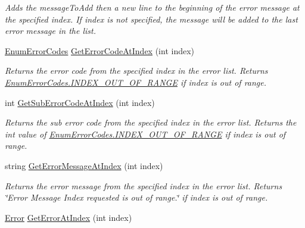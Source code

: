 \begin{DoxyCompactItemize}
\begin{DoxyCompactList}\small\item\em Adds the message\+To\+Add then a new line to the beginning of the error message at the specified index. If index is not specified, the message will be added to the last error message in the list. \end{DoxyCompactList}\item 
\mbox{\hyperlink{namespace_c_s_i_1_1_library_1_1_errors_a5534735de1ef2256eb4c52c7440e30d7}{Enum\+Error\+Codes}} \mbox{\hyperlink{class_c_s_i_1_1_library_1_1_errors_1_1_error_list_a0aa479114c9e50fc432b7fddae90f877}{Get\+Error\+Code\+At\+Index}} (int index)
\begin{DoxyCompactList}\small\item\em Returns the error code from the specified index in the error list. Returns \mbox{\hyperlink{namespace_c_s_i_1_1_library_1_1_errors_a5534735de1ef2256eb4c52c7440e30d7a577cf42cc2eae1cffef0f749c6c08787}{Enum\+Error\+Codes.\+I\+N\+D\+E\+X\+\_\+\+O\+U\+T\+\_\+\+O\+F\+\_\+\+R\+A\+N\+GE}} if index is out of range. \end{DoxyCompactList}\item 
int \mbox{\hyperlink{class_c_s_i_1_1_library_1_1_errors_1_1_error_list_a30c56b5ef9bea09a590c28a772e282ea}{Get\+Sub\+Error\+Code\+At\+Index}} (int index)
\begin{DoxyCompactList}\small\item\em Returns the sub error code from the specified index in the error list. Returns the int value of \mbox{\hyperlink{namespace_c_s_i_1_1_library_1_1_errors_a5534735de1ef2256eb4c52c7440e30d7a577cf42cc2eae1cffef0f749c6c08787}{Enum\+Error\+Codes.\+I\+N\+D\+E\+X\+\_\+\+O\+U\+T\+\_\+\+O\+F\+\_\+\+R\+A\+N\+GE}} if index is out of range. \end{DoxyCompactList}\item 
string \mbox{\hyperlink{class_c_s_i_1_1_library_1_1_errors_1_1_error_list_a5b395f7a7a6c43878f28a2d1439f0bca}{Get\+Error\+Message\+At\+Index}} (int index)
\begin{DoxyCompactList}\small\item\em Returns the error message from the specified index in the error list. Returns \char`\"{}\+Error Message Index requested is out of range.\char`\"{} if index is out of range. \end{DoxyCompactList}\item 
\mbox{\hyperlink{class_c_s_i_1_1_library_1_1_errors_1_1_error}{Error}} \mbox{\hyperlink{class_c_s_i_1_1_library_1_1_errors_1_1_error_list_aefb5a63d694f8e006e9451eacc7a85c6}{Get\+Error\+At\+Index}} (int index)

\end{DoxyCompactItemize}
